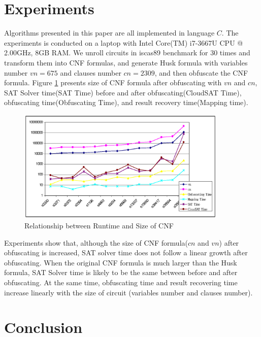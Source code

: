 \documentclass[runningheads,a4paper]{llncs}
\begin{document}
\section{Experiments}\label{exp}

Algorithms presented in this paper are all implemented in language $C$.
The experiments is conducted on a laptop with Intel Core(TM) i7-3667U CPU @ 2.00GHz, 8GB RAM. 
We unroll circuits in iscas89 benchmark for 30 times and transform them into CNF formulas,
and generate Husk formula with variables number $vn=675$ and clauses number $cn=2309$,
and then obfuscate the CNF formula.
Figure \ref{fig_exp} presents size of CNF formula after obfuscating with $vn$ and $cn$,
SAT Solver time(SAT Time) before and after obfuscating(CloudSAT Time),
obfuscating time(Obfuscating Time),
and result recovery time(Mapping time).


\begin{figure}
\centering
\includegraphics[width=10cm]{p1}
\caption{Relationship between Runtime and Size of CNF }
\label{fig_exp}
\end{figure}

Experiments show that, although the size of CNF formula($cn$ and $vn$) after obfuscating is increased,
SAT solver time does not follow a linear growth after obfuscating.
When the original CNF formula is much larger than the Husk formula,
SAT Solver time is likely to be the same between before and after obfuscating. 
At the same time,
obfuscating time and result recovering time increase linearly with the size of circuit 
(variables number and clauses number).

\section{Conclusion}\label{conclude}
\end{document}
